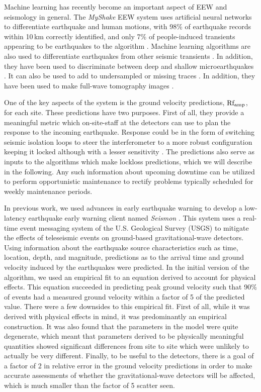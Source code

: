 \documentclass[preprint, aps, showpacs]{revtex4-1}
\begin{document}
Machine learning has recently become an important aspect of EEW and seismology in general.
The \emph{MyShake} EEW system uses artificial neural networks to differentiate earthquake and human motions, with 98\% of earthquake records within 10\,km correctly identified, and only 7\% of people-induced transients appearing to be earthquakes to the algorithm  \cite{KoAl2016}.
Machine learning algorithms are also used to differentiate earthquakes from other seismic transients \cite{KuYi2011,KoUs2016,PeGh2017}.
In addition, they have been used to discriminate between deep and shallow microearthquakes \cite{MoHo2016}.
It can also be used to add to undersampled or missing traces \cite{JiMa2017}.
In addition, they have been used to make full-wave tomography images \cite{DiLe2011}.

One of the key aspects of the system is the ground velocity predictions, $\rm Rf_{amp}$, for each site. These predictions have two purposes. 
First of all, they provide a meaningful metric which on-site-staff at the detectors can use to plan the response to the incoming earthquake. Response could be in the form of switching seismic isolation loops to steer the interferometer to a more robust configuration keeping it locked although with a lesser sensitivity \cite{BiWa2018}. The predictions also serve as inputs to the algorithms which make lockloss predictions, which we will describe in the following. Any such information about upcoming downtime can be utilized to perform opportunistic maintenance to rectify problems typically scheduled for weekly maintenance periods.

In previous work, we used advances in early earthquake warning to develop a low-latency earthquake early warning client named \emph{Seismon} \cite{CoEa2017}. This system uses a real-time event messaging system of the U.S. Geological Survey (USGS) to mitigate the effects of teleseismic events on ground-based gravitational-wave detectors. 
Using information about the earthquake source characteristics such as time, location, depth, and magnitude, predictions as to the arrival time and ground velocity induced by the earthquakes were predicted.
In the initial version of the algorithm, we used an empirical fit to an equation derived to account for physical effects. This equation succeeded in predicting peak ground velocity such that 90\% of events had a measured ground velocity within a factor of 5 of the predicted value.
There were a few downsides to this empirical fit.
First of all, while it was derived with physical effects in mind, it was predominantly an empirical construction.
It was also found that the parameters in the model were quite degenerate, which meant that parameters derived to be physically meaningful quantities showed significant differences from site to site which were unlikely to actually be very different.
Finally, to be useful to the detectors, there is a goal of a factor of 2 in relative error in the ground velocity predictions in order to make accurate assessments of whether the gravitational-wave detectors will be affected, which is much smaller than the factor of 5 scatter seen. 
\end{document}

